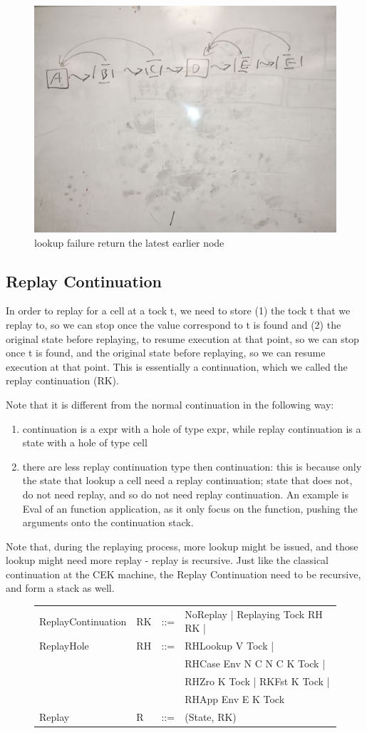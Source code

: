 \begin{figure}
	\includegraphics[width=0.5\columnwidth]{img4}
	\caption{lookup failure return the latest earlier node}
\end{figure}

\subsection{Replay Continuation}
In order to replay for a cell at a tock t, we need to store (1) the tock t that we replay to, so we can stop once the value correspond to t is found and (2) the original state before replaying, to resume execution at that point, so we can stop once t is found, and the original state before replaying, so we can resume execution at that point. 
This is essentially a continuation, which we called the replay continuation (RK).

Note that it is different from the normal continuation in the following way:
\begin{enumerate}
	\item continuation is a expr with a hole of type expr, while replay continuation is a state with a hole of type cell
	\item there are less replay continuation type then continuation: this is because only the state that lookup a cell need a replay continuation; state that does not, do not need replay, and so do not need replay continuation. An example is Eval of an function application, as it only focus on the function, pushing the arguments onto the continuation stack. 
\end{enumerate}

Note that, during the replaying process, more lookup might be issued, and those lookup might need more replay - replay is recursive. Just like the classical continuation at the CEK machine, the Replay Continuation need to be recursive, and form a stack as well.
\begin{figure}
	\begin{tabular}{p{10em} p{2.6em} p{1em} p{}}
		ReplayContinuation & RK & ::= & NoReplay | Replaying Tock RH RK | \\
		ReplayHole & RH & ::= & RHLookup V Tock | \\
		& & & RHCase Env N C N C K Tock | \\
		& & & RHZro K Tock | RKFst K Tock | \\
		& & & RHApp Env E K Tock \\
		Replay & R & ::= & (State, RK) \\
	\end{tabular}
\end{figure}

